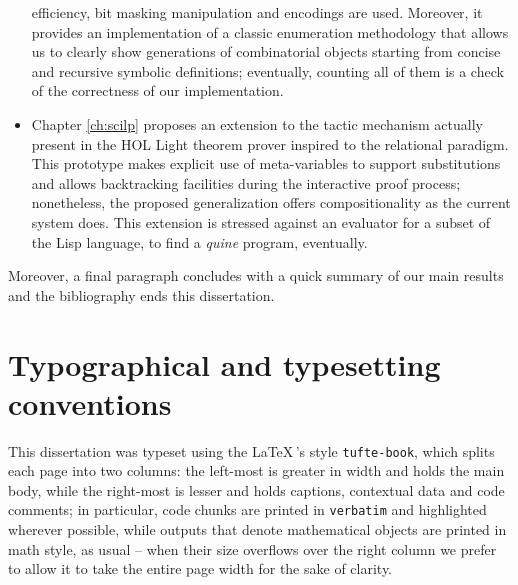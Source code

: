 \begin{itemize}
efficiency, bit masking manipulation and encodings are used. Moreover, it
provides an implementation of a classic enumeration methodology that allows us
to clearly show generations of combinatorial objects starting from concise and
recursive symbolic definitions; eventually, counting all of them is a check of
the correctness of our implementation.
\item Chapter \ref{ch:scilp} proposes an extension to the tactic mechanism
actually present in the HOL Light theorem prover inspired to the relational
paradigm. This prototype makes explicit use of meta-variables to support
substitutions and allows backtracking facilities during the interactive proof
process; nonetheless, the proposed generalization offers compositionality as
the current system does. This extension is stressed against an evaluator for a
subset of the Lisp language, to find a \textit{quine} program, eventually.
\end{itemize}

Moreover, a final paragraph concludes with a quick summary of our main results
and the bibliography ends this dissertation.

\section*{Typographical and typesetting conventions}

This dissertation was typeset using the \LaTeX\,'s style \verb|tufte-book|,
which splits each page into two columns: the left-most is greater in width and
holds the main body, while the right-most is lesser and holds captions,
contextual data and code comments; in particular, code chunks are printed in
\verb|verbatim| and highlighted wherever possible, while outputs that denote
mathematical objects are printed in math style, as usual -- when their size
overflows over the right column we prefer to allow it to take the entire
page width for the sake of clarity.




